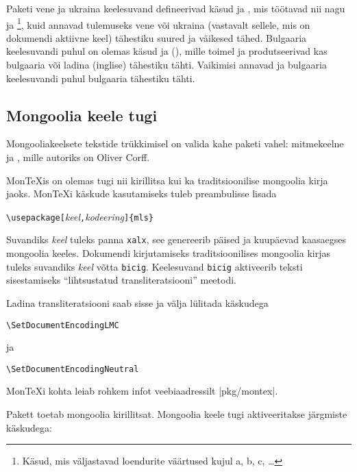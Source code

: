 Paketi  vene ja ukraina keelesuvand defineerivad käsud
 ja , mis töötavad nii nagu  ja
\footnote{Käsud, mis väljastavad loendurite väärtused kujul a,
b, c, \ldots}, kuid annavad tulemuseks vene või ukraina (vastavalt
sellele, mis on dokumendi aktiivne keel) tähestiku suured ja väikesed
tähed. Bulgaaria keelesuvandi puhul on olemas käsud  ja
 (), mille toimel  ja 
produtseerivad kas bulgaaria või ladina (inglise) tähestiku tähti.
Vaikimisi annavad  ja  bulgaaria keelesuvandi puhul
bulgaaria tähestiku tähti.


\subsection{Mongoolia keele tugi}

Mongooliakeelsete tekstide trükkimisel on valida
kahe paketi vahel: mitmekeelne  ja , mille
autoriks on Oliver Corff.

Mon\TeX is on olemas tugi nii kirillitsa kui ka
traditsioonilise mongoolia kirja jaoks. Mon\TeX i käskude kasutamiseks
tuleb preambulisse lisada
\begin{lscommand}
\verb|\usepackage[|\emph{keel}\verb|,|\emph{kodeering}\verb|]{mls}|
\end{lscommand}
\noindent Suvandiks \emph{keel} tuleks panna \texttt{xalx}, see
genereerib päised ja kuupäevad kaasaegses mongoolia keeles. Dokumendi
kirjutamiseks traditsioonilises mongoolia kirjas tuleks suvandiks
\emph{keel} võtta \texttt{bicig}. Keelesuvand \texttt{bicig} aktiveerib
teksti sisestamiseks "`lihtsustatud transliteratsiooni"' meetodi.

Ladina transliteratsiooni saab sisse ja välja lülitada käskudega
\begin{lscommand}
\verb|\SetDocumentEncodingLMC|
\end{lscommand}
\noindent ja
\begin{lscommand}
\verb|\SetDocumentEncodingNeutral|
\end{lscommand}

Mon\TeX i kohta leiab rohkem infot veebiaadressilt
\CTAN|pkg/montex|.

Pakett  toetab mongoolia kirillitsat. Mongoolia keele tugi
aktiveeritakse järgmiste käskudega:

